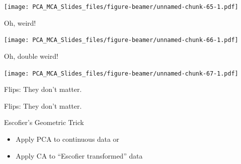 \documentclass[
  ignorenonframetext,
]{beamer}
\providecommand{\tightlist}{%
  \setlength{\itemsep}{0pt}\setlength{\parskip}{0pt}}
\begin{document}
\begin{frame}

\texttt{[image: PCA\_MCA\_Slides\_files/figure-beamer/unnamed-chunk-65-1.pdf]}

\begin{center}Oh, weird!\end{center}

\end{frame}

\begin{frame}

\texttt{[image: PCA\_MCA\_Slides\_files/figure-beamer/unnamed-chunk-66-1.pdf]}

\begin{center}Oh, double weird!\end{center}

\end{frame}

\begin{frame}

\texttt{[image: PCA\_MCA\_Slides\_files/figure-beamer/unnamed-chunk-67-1.pdf]}

\begin{center}Flips: They don't matter.\end{center}

\end{frame}

\begin{frame}

\begin{table}[H]
\centering
{}
\end{table}
\begin{center}Flips: They don't matter.\end{center}

\end{frame}

\begin{frame}{Escofier's Geometric Trick}
\protect\hypertarget{escofiers-geometric-trick}{}

\begin{itemize}[<+->]
\tightlist
\item
  Apply PCA to continuous data or
\item
  Apply CA to ``Escofier transformed'' data
\end{itemize}

\end{frame}
\end{document}
